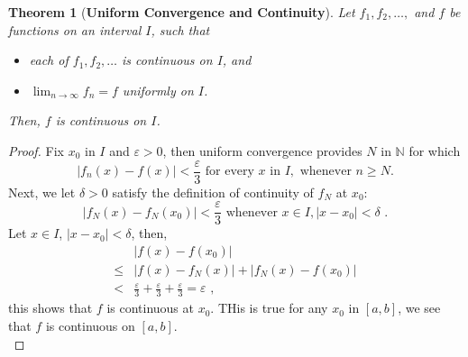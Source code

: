\documentclass[12pt]{article}
\theoremstyle{plain}
\newtheorem{theorem}{Theorem}[subsection]
\newcommand{\abs}[1]{\left| #1 \right|}
\newcommand{\ep}{\varepsilon}
\begin{document}
\begin{theorem}[\textbf{Uniform Convergence and Continuity}]
	Let $f_1, f_2, \ldots, $ and $f$ be functions on an interval $I$, such that
	\begin{itemize}
		\item each of $f_1, f_2, \ldots$ is continuous on $I$, and 
		\item $\lim_{n\to\infty} f_n = f$ uniformly on $I$.
	\end{itemize}
	Then, $f$ is continuous on $I$. 
\end{theorem}
\begin{proof}
	Fix $x_0$ in $I$ and $\ep > 0$, then uniform convergence provides $N$ in 
	$\mathbb{N}$ for which 
	\[
		\abs{f_n(x) - f(x)} < \frac{\ep}3 \text{ for every } x \text{ in }
		I, \text{ whenever } n \geq N. 
	\]
	Next, we let $\delta > 0$ satisfy the definition of continuity of $f_N$ at
	$x_0$: 
	\[
		\abs{f_N(x) - f_N(x_0)} < \frac{\ep}3 \text{ whenever } x \in I, 
		\abs{x - x_0} < \delta \,\, .
	\]
	Let $ x\in I$, $\abs{x - x_0} < \delta$, then, 
	\begin{align*}
		&\abs{f(x) - f(x_0)}
		\\
		\leq& \abs{f(x) - f_N(x)} + \abs{f_N(x) -f(x_0)}
		\\
		<& \frac{\ep}3 + \frac{\ep}3 + \frac{\ep}3 = \ep \,\, , 
	\end{align*}
	this shows that $f$ is continuous at $x_0$. THis is true for any $x_0$ in 
	$[a,b]$, we see that $f$ is continuous on $[a,b]$.	\\
\end{proof}
\end{document}
